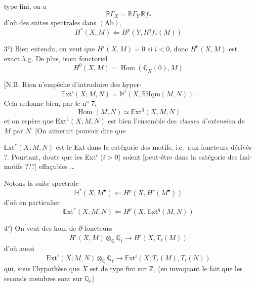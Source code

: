 \documentclass[11pt,a4paper]{article}
\begin{document}

type fini, on a
\[
  \mathbb{R}\Gamma_{X} = \mathbb{R}\Gamma_{Y}\, \mathbb{R}f_{*}
\]
d'où des suites spectrales dans $(\mathrm{Ab})$,
\[
  H^{*}(X, M) \Longleftarrow H^{p}(Y, R^{q}f_{*}(M))
\]

3°) Bien entendu, on veut que $H^{i}(X, M) = 0$ si $i < 0$, donc
$H^{0}(X, M)$ est exact à g. De plus,
isom fonctoriel
\[
  H^{0}(X, M) = \operatorname{Hom}(\mathbb{Q}_{X}(0), M)
\]

[N.B. Rien n'empêche d'introduire des hyper-
\[
  \mathbb{E}\mathrm{xt}^{i}(X ; M, N) = \mathbb{H}^{i}(X, \mathbb{R}\underline{\mathrm{Hom}}(M, N)) .
\]
Cela redonne bien, par le n° 7,
\[
  \operatorname{Hom}(M, N) \simeq \mathbb{E}\mathrm{xt}^{0}(X, M, N)
\]
et on espère que $\mathrm{Ext}^{1}(X ; M, N)$ est bien l'ensemble des
\emph{classes d'extension} de $M$ par $N$. [On aimerait pouvoir dire que

$\mathbb{E}\mathrm{xt}^{*}(X ; M, N)$ est le \struck{\ill{}} Ext dans la
catégorie des motifs, i.e.\ aux foncteurs dérivés ?.
Pourtant, doute que les Ext$^{i}$ ($i > 0$) soient
[peut-être dans la catégorie des Ind-motifs ???]
effaçables …

Notons la suite spectrale
\[
  \mathbb{H}^{*}(X, M^{\bullet}) \Longleftarrow H^{p}(X, H^{q}(M^{\bullet}))
\]
d'où en particulier
\[
  \mathbb{E}\mathrm{xt}^{*}(X, M, N) \Longleftarrow H^{p}(X, \underline{\mathrm{Ext}}^{q}(M, N))
\]

4°) On veut 
des hom de $\partial$-foncteurs 
\[
  H^{i}(X, M) \otimes_{\mathbb{Q}} \mathbb{Q}_{\ell} \longrightarrow H^{i}(X, T_{\ell}(M))
\]
d'où aussi
\[
  \mathrm{Ext}^{i}(X ; M, N) \otimes_{\mathbb{Q}} \mathbb{Q}_{\ell} \longrightarrow \mathbb{E}\mathrm{xt}^{i}(X ; T_{\ell}(M), T_{\ell}(N))
\]
qui, sous l'hypothèse que $X$ est de type fini sur $\mathbb{Z}$,
 \struck{\ill{}}
(en invoquant le fait que les seconds membres sont 
sur $\mathbb{Q}_{\ell}$)
\end{document}
